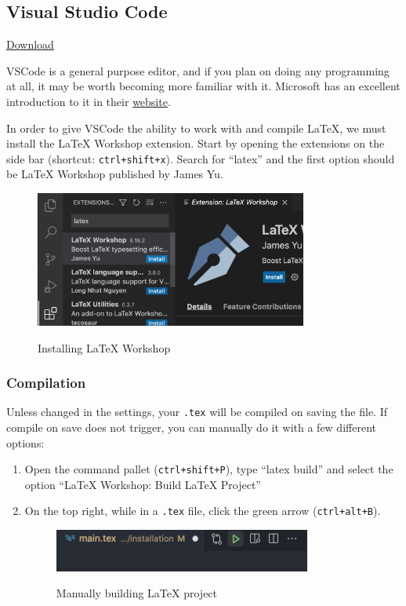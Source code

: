 \subsection{Visual Studio Code}
\href{https://code.visualstudio.com/}{Download}

VSCode is a general purpose editor, and if you plan on doing any programming at all, it may be worth becoming more familiar with it.
Microsoft has an excellent introduction to it in their \href{https://code.visualstudio.com/docs}{website}.

In order to give VSCode the ability to work with and compile \LaTeX{}, we must install the LaTeX Workshop extension.
Start by opening the extensions on the side bar (shortcut: \texttt{ctrl+shift+x}).
Search for ``latex'' and the first option should be LaTeX Workshop published by James Yu.

\begin{figure}[h]
\centering
    \includegraphics[width=0.8\textwidth]{figures/extension.png}
\label{fig:extension}
\caption{Installing LaTeX Workshop}
\end{figure}

\subsubsection{Compilation}
Unless changed in the settings, your \texttt{.tex} will be compiled on saving the file.
If compile on save does not trigger, you can manually do it with a few different options:
\begin{enumerate}
    \item Open the command pallet (\verb|ctrl+shift+P|), type ``latex build'' and select the option ``LaTeX Workshop: Build LaTeX Project''
    \item On the top right, while in a \texttt{.tex} file, click the green arrow (\texttt{ctrl+alt+B}).
    \begin{figure}[h]
    \centering
        \includegraphics[width=0.8\textwidth]{figures/build.png}
    \label{fig:build}
    \caption{Manually building LaTeX project}
    \end{figure}
\end{enumerate} 

